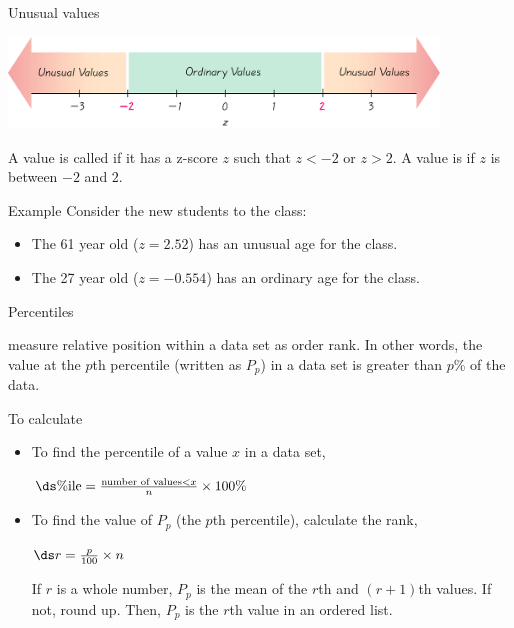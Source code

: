 \documentclass[xcolor=table]{beamer}
\begin{document}
\begin{frame}{Unusual values}

{\centering
\includegraphics[width=4.5in]{../images/ch03_unusual} \par
}

\begin{block}{}
\large
A value is called  if it has a z-score $z$ such that $z< -2$ or $z > 2$. A value is  if $z$ is between $-2$ and $2$.
\end{block}

\pause
\begin{exampleblock}{Example}
Consider the new students to the class:
\begin{itemize}
\item The 61 year old ($z=2.52$) has an unusual age for the class. 
\item The 27 year old ($z=-0.554$) has an ordinary age for the class.
\end{itemize}
\end{exampleblock}
\end{frame}

\begin{frame}{Percentiles}
\begin{block}{}
\large
{} measure relative position within a data set as order rank. In other words, the value at the $p$th percentile (written as $P_p$) in a data set is greater than $p$\% of the data.
\end{block}

\pause
\begin{block}{To calculate}
\begin{itemize}
\item To find the percentile of a value $x$ in a data set,\\
\smallskip
{\centering
$\ds \%\text{ile} = \frac{\text{number of values} < x}{n} \times 100\%$
\par}
\medskip
\pause\item To find the value of $P_p$ (the $p$th percentile), calculate the rank,\\
\smallskip
{\centering
$\ds r = \frac p {100} \times n$
\par}
\medskip
If $r$ is a whole number, $P_p$ is the mean of the $r$th and $(r+1)$th values. If not, round up. Then, $P_p$ is the $r$th value in an ordered list.
\end{itemize}
\end{block}
\end{frame}
\end{document}
